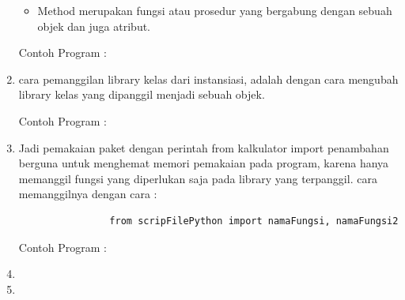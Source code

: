 \begin{enumerate}
\begin{itemize}
						\item Method merupakan fungsi atau prosedur yang bergabung dengan sebuah objek dan juga atribut.
					\end{itemize}
					
					Contoh Program :
					
					
			\item cara pemanggilan library kelas dari instansiasi, adalah dengan cara mengubah library kelas yang dipanggil menjadi sebuah objek.
			
			Contoh Program : 
			
			
			\item Jadi pemakaian paket dengan perintah from kalkulator import penambahan berguna untuk menghemat memori pemakaian pada program, karena hanya memanggil fungsi yang diperlukan saja pada library yang terpanggil. cara memanggilnya dengan cara :
				\begin{verbatim}
				from scripFilePython import namaFungsi, namaFungsi2
				\end{verbatim}
				
			Contoh Program :
			
			
			\item 
			
			\item 
			
		\end{enumerate}
		
